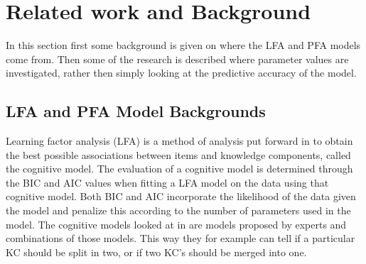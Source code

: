 \documentclass{scrartcl}
\newcommand\todo[1]{\textit{\textcolor{red}{#1}}}
\begin{document}

\section{Related work and Background}
\label{sec:RW}
In this section first some background is given on where the LFA and PFA models come from. Then some of the research is described where parameter values are investigated, rather then simply looking at the predictive accuracy of the model. 
\subsection{LFA and PFA Model Backgrounds}
Learning factor analysis (LFA) is a method of analysis put forward in \cite{lfa} to obtain the best possible associations between items and knowledge components, called the cognitive model. The evaluation of a cognitive model is determined through the BIC and AIC values when fitting a LFA model on the data using that cognitive model. Both BIC and AIC incorporate the likelihood of the data given the model and penalize this according to the number of parameters used in the model. The cognitive models looked at in \cite{lfa} are models proposed by experts and combinations of those models. This way they for example can tell if a particular KC should be split in two, or if two KC's should be merged into one.
\end{document}
